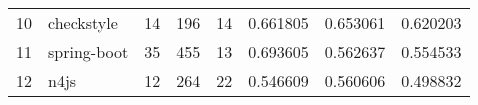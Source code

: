 \begin{tabular}{llrrrrrr}
10 &         checkstyle &                         14 &                        196 &                                 14 &                    0.661805 &                 0.653061 &             0.620203 \\
11 &        spring-boot &                         35 &                        455 &                                 13 &                    0.693605 &                 0.562637 &             0.554533 \\
12 &               n4js &                         12 &                        264 &                                 22 &                    0.546609 &                 0.560606 &             0.498832 \\
\bottomrule
\end{tabular}
